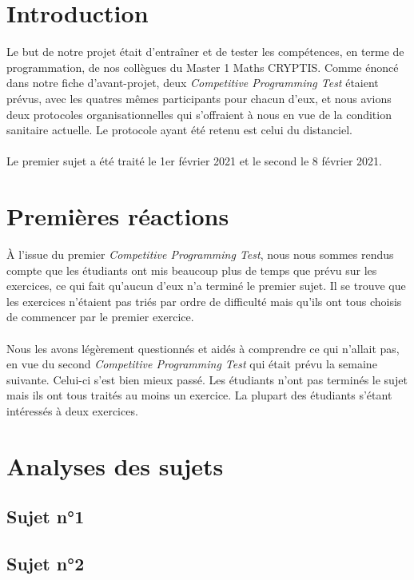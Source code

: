 \documentclass[12pt]{article}
\begin{document}
\tableofcontents
\pagebreak

\section{Introduction}
Le but de notre projet était d'entraîner et de tester les compétences, en terme de programmation, de nos collègues du \textsf{Master 1 Maths CRYPTIS}. Comme énoncé dans notre fiche d'avant-projet, deux \textsl{Competitive Programming Test} étaient prévus, avec les quatres mêmes participants pour chacun d'eux, et nous avions deux protocoles organisationnelles qui s'offraient à nous en vue de la condition sanitaire actuelle. Le protocole ayant été retenu est celui du distanciel.\\
\\
Le premier sujet a été traité le 1er février 2021 et le second le 8 février 2021.

\vfill \eject

\section{Premières réactions}
À l'issue du premier \textsl{Competitive Programming Test}, nous nous sommes rendus compte que les étudiants ont mis beaucoup plus de temps que prévu sur les exercices, ce qui fait qu'aucun d'eux n'a terminé le premier sujet. Il se trouve que les exercices n'étaient pas triés par ordre de difficulté mais qu'ils ont tous choisis de commencer par le premier exercice.\\\\
Nous les avons légèrement questionnés et aidés à comprendre ce qui n'allait pas, en vue du second \textsl{Competitive Programming Test} qui était prévu la semaine suivante. Celui-ci s'est bien mieux passé. Les étudiants n'ont pas terminés le sujet mais ils ont tous traités au moins un exercice. La plupart des étudiants s'étant intéressés à deux exercices.

\section{Analyses des sujets}
\subsection{Sujet n°1}

\subsection{Sujet n°2}
\end{document}
